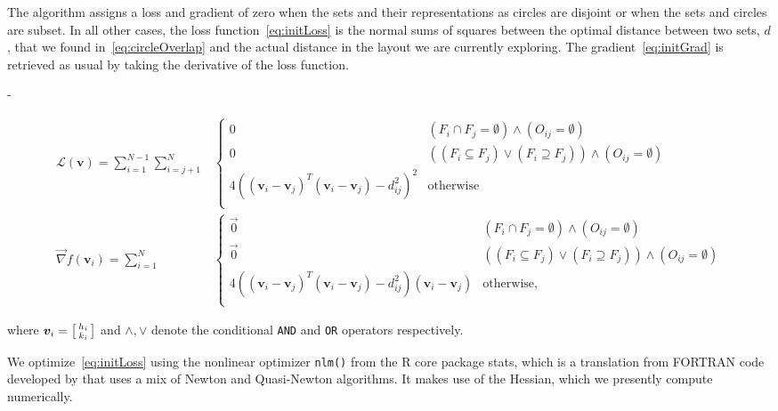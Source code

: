 \documentclass[
  oneside,
  openany,
  numbers=noendperiod,
  parskip=half,
  bibliography=totoc
]{scrbook}\usepackage[]{graphicx}\usepackage{xcolor}
\newlength{\overhang}
\newenvironment{fullwidth}{
  \begin{addmargin*}[0em]{-\overhang}
  }{
  \end{addmargin*}
}
\newcommand{\pkg}[1]{{\fontseries{b}\selectfont #1}}
\newcommand{\code}[1]{\texttt{#1}}
\begin{document}
The algorithm assigns a loss and gradient of zero when the sets and their
representations as circles are disjoint or when the sets and circles are subset.
In all other cases, the loss function~\eqref{eq:initLoss} is the normal sums of
squares between the optimal distance between two sets, $d$, that we found
in~\eqref{eq:circleOverlap} and the actual distance in the layout we are
currently exploring. The gradient~\eqref{eq:initGrad} is retrieved as usual by
taking the derivative of the loss function.
\begin{fullwidth}
\begin{align}
\mathcal{L}(\bm{v}) = \sum_{i=1}^{N-1} \sum_{i=j+1}^{N}
& \begin{cases}
  0 & (F_i \cap F_j = \emptyset) \wedge (O_{ij} = \emptyset)\\
  0 & \left((F_i \subseteq F_j) \vee (F_i \supseteq F_j)\right) \wedge (O_{ij}=\emptyset)\\
  4 ((\bm{v}_i - \bm{v}_j)^{\scriptscriptstyle T}(\bm{v}_i - \bm{v}_j) - d_{ij}^2)^2  & \text{otherwise} \\
\end{cases} \label{eq:initLoss} \\
\vec{\nabla} f(\bm{v}_i) = \sum_{i=1}^N
& \begin{cases}
  \vec{0} & (F_i \cap F_j = \emptyset) \wedge (O_{ij} = \emptyset)\\
  \vec{0} & \left((F_i \subseteq F_j) \vee (F_i \supseteq F_j)\right) \wedge (O_{ij}=\emptyset)\\
  4 \left((\bm{v}_i - \bm{v}_j)^{\scriptscriptstyle T}(\bm{v}_i - \bm{v}_j) - d_{ij}^2\right) (\bm{v}_i - \bm{v}_j) & \text{otherwise}, \\
\end{cases} \label{eq:initGrad}
\end{align}
\end{fullwidth}
where $\bm{v}_i = \begin{bsmallmatrix}h_i \\ k_i\end{bsmallmatrix}$ and $\wedge,\vee$ denote the conditional \texttt{AND} and \texttt{OR} operators respectively.

We optimize~\eqref{eq:initLoss} using the nonlinear optimizer \code{nlm()} from
the R core package \pkg{stats}, which is a translation from FORTRAN code
developed by \citet{schnabel_1985} that uses a mix of Newton and Quasi-Newton
algorithms. It makes use of the Hessian, which we presently compute
numerically.
\end{document}
